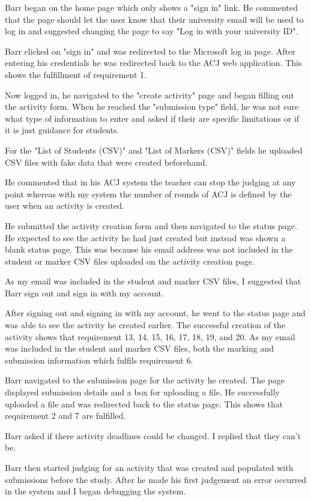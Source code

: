 \documentclass{l4proj}
\begin{document}
Barr began on the home page which only shows a "sign in" link. He commented that the page should let the user know that their university email will be used to log in and suggested changing the page to say "Log in with your university ID".

Barr clicked on "sign in" and was redirected to the Microsoft log in page. After entering his credentials he was redirected back to the ACJ web application. This shows the fulfillment of requirement 1.

Now logged in, he navigated to the "create activity" page and began filling out the activity form. When he reached the "submission type" field, he was not sure what type of information to enter and asked if their are specific limitations or if it is just guidance for students.

For the "List of Students (CSV)" and "List of Markers (CSV)" fields he uploaded CSV files with fake data that were created beforehand.

He commented that in his ACJ system the teacher can stop the judging at any point whereas with my system the number of rounds of ACJ is defined by the user when an activity is created.

He submitted the activity creation form and then navigated to the status page. He expected to see the activity he had just created but instead was shown a blank status page. This was because his email address was not included in the student or marker CSV files uploaded on the activity creation page.


As my email was included in the student and marker CSV files, I suggested that Barr sign out and sign in with my account.

After signing out and signing in with my account, he went to the status page and was able to see the activity he created earlier. The successful creation of the activity shows that requirement 13, 14, 15, 16, 17, 18, 19, and 20. As my email was included in the student and marker CSV files, both the marking and submission information which fulfils requirement 6.

Barr navigated to the submission page for the activity he created. The page displayed submission details and a box for uploading a file. He successfully uploaded a file and was redirected back to the status page. This shows that requirement 2 and 7 are fulfilled.

Barr asked if there activity deadlines could be changed. I replied that they can't be.

Barr then started judging for an activity that was created and populated with submissions before the study. After he made his first judgement an error occurred in the system and I began debugging the system.
\end{document}
